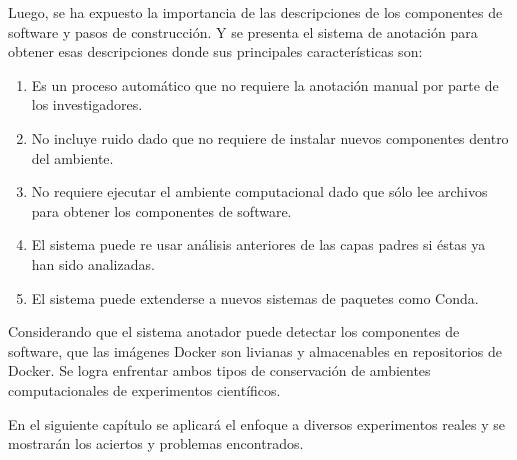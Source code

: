 Luego, se ha expuesto la importancia de las descripciones de los componentes de software y pasos de construcción.
Y se presenta el sistema de anotación para obtener esas descripciones donde sus principales características son:
\begin{enumerate}
	\item Es un proceso automático que no requiere la anotación manual por parte de los investigadores.
	\item No incluye ruido dado que no requiere de instalar nuevos componentes dentro del ambiente.
	\item No requiere ejecutar el ambiente computacional dado que  sólo lee archivos para obtener los componentes de software.
	\item El sistema puede re usar análisis anteriores de las capas padres si éstas ya han sido analizadas.
	\item El sistema puede extenderse a nuevos sistemas de paquetes como Conda.
\end{enumerate}

Considerando que el sistema anotador puede detectar los componentes de software, que las imágenes Docker son livianas y almacenables en repositorios de Docker. Se logra enfrentar ambos tipos de conservación de ambientes computacionales de experimentos científicos. 

En el siguiente capítulo se aplicará el enfoque a diversos experimentos reales y se mostrarán los aciertos y problemas encontrados.